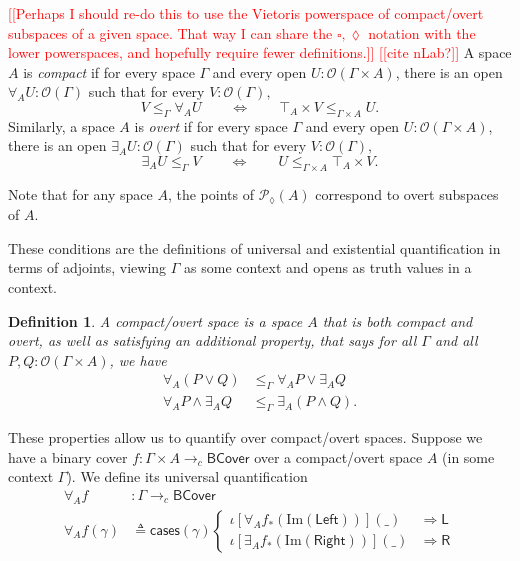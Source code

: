 \documentclass[conference]{IEEEtran}
\newtheorem{definition}{Definition}
\newcommand{\PLower}{\mathcal{P}_\lozenge}
\newcommand{\cto}{\to_c}
\newcommand{\Open}[1]{\mathcal{O}({#1})}
\newcommand{\wildcard}{\_}
\newcommand{\Img}[1]{\text{Im}\left({#1}\right)}
\newcommand{\oinclf}[1]{\iota[{#1}]}
\newcommand{\oincl}[2]{\oinclf{#1} \left({#2}\right)}
\newcommand{\Branch}{\Rightarrow}
\newcommand{\BCover}{\mathsf{BCover}}
\newcommand{\note}[1]{\textcolor{red}{[[{#1}]]}}
\begin{document}
\note{Perhaps I should re-do this to use the Vietoris powerspace of compact/overt subspaces of a given space. That way I can share the $\square, \lozenge$ notation with the lower powerspaces, and hopefully require fewer definitions.}
\note{cite nLab?}
A space $A$ is \emph{compact} if for every space $\Gamma$ and every open $U : \Open{\Gamma \times A}$, there is an open $\forall_A U : \Open{\Gamma}$ such that for every $V : \Open{\Gamma},$
\[
V \le_\Gamma \forall_A U \qquad \Leftrightarrow \qquad \top_A \times V \le_{\Gamma \times A} U.
\]
Similarly, a space $A$ is \emph{overt} if for every space $\Gamma$ and every open $U : \Open{\Gamma \times A}$, there is an open $\exists_A U : \Open{\Gamma}$ such that for every $V : \Open{\Gamma},$
\[
\exists_A U \le_\Gamma V  \qquad \Leftrightarrow \qquad U  \le_{\Gamma \times A} \top_A \times V.
\]

Note that for any space $A$, the points of $\PLower(A)$ correspond to overt subspaces of $A$.

These conditions are the definitions of universal and existential quantification in terms of adjoints, viewing $\Gamma$ as some context and opens as truth values in a context.

\begin{definition}
A \emph{compact/overt} space is a space $A$ that is both compact and overt, as well as satisfying an additional property, that says for all $\Gamma$ and all $P, Q : \Open{\Gamma \times A}$, we have
\begin{align*}
\forall_A(P \vee Q) &\le_\Gamma \forall_A P \vee \exists_A Q
\\  \forall_A P \wedge \exists_A Q &\le_\Gamma \exists_A (P \wedge Q).
\end{align*}
\end{definition}
These properties allow us to quantify over compact/overt spaces. Suppose we have a binary cover $f : \Gamma \times A \cto \BCover$ over a compact/overt space $A$ (in some context $\Gamma$). We define its universal quantification
\begin{align*}
\forall_A f &: \Gamma \cto \BCover
\\ \forall_A f(\gamma) &\triangleq \mathsf{cases}(\mathsf{\gamma})
\begin{cases}
\oincl{\forall_A f_*(\Img{\mathsf{Left}})}{\wildcard} &\Branch \mathsf{L}
\\ \oincl{\exists_A f_*(\Img{\mathsf{Right}})}{\wildcard} &\Branch \mathsf{R}
\end{cases}
\end{align*}
\end{document}
